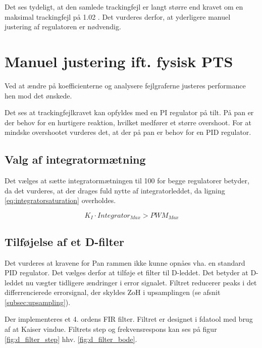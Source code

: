 Det ses tydeligt, at den samlede trackingfejl er langt større end kravet om en 
maksimal trackingfejl på 1.02 \degree.
Det vurderes derfor, at yderligere manuel justering af regulatoren er nødvendig.

\section{Manuel justering ift. fysisk PTS}

Ved at ændre på koefficienterne og analysere fejlgraferne justeres performance 
hen mod det ønskede.

Det ses at trackingfejlkravet kan opfyldes med en PI regulator på tilt.
På pan er der behov for en hurtigere reaktion, hvilket medfører et større overshoot. 
For at mindske overshootet vurderes det, at der på pan er behov for en PID 
regulator.


\subsection{Valg af integratormætning}
Det vælges at sætte integratormætningen til 100 for begge regulatorer betyder, da det vurderes, at der drages
fuld nytte af integratorleddet, da ligning \ref{eq:integratorsaturation} 
overholdes.

\begin{equation}
	K_I \cdot Integrator_{Max} > PWM_{Max}
\label{eq:integratorsaturation} 
\end{equation}



\subsection{Tilføjelse af et D-filter}
Det vurderes at kravene for Pan rammen ikke kunne opnåes vha. en standard PID regulator. 
Det vælges derfor at tilføje et filter til D-leddet. 
Det betyder at D-leddet nu vægter tidligere ændringer i error signalet. 
Filtret reducerer peaks i det differrencierede errorsignal, der skyldes ZoH i upsamplingen (se afsnit \ref{subsec:upsampling}).

Der implementeres et 4. ordens FIR filter. Filtret er designet i fdatool med brug af at Kaiser vindue. Filtrets step og frekvensrespons kan ses på figur \ref{fig:d_filter_step} hhv. \ref{fig:d_filter_bode}. 

